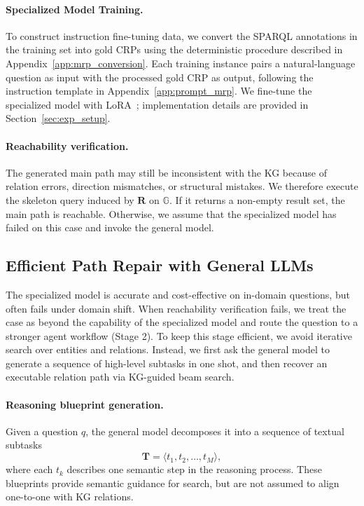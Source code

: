 \documentclass[11pt]{article}
\begin{document}
\paragraph{Specialized Model Training.}
To construct instruction fine-tuning data, we convert the SPARQL annotations in the training set into gold CRPs using the deterministic procedure described in Appendix~\ref{app:mrp_conversion}. Each training instance pairs a natural-language question as input with the processed gold CRP as output, following the instruction template in Appendix~\ref{app:prompt_mrp}. We fine-tune the specialized model with LoRA~\citep{hu2022lora}; implementation details are provided in Section~\ref{sec:exp_setup}.

\paragraph{Reachability verification.}
The generated main path may still be inconsistent with the KG because of relation errors, direction mismatches, or structural mistakes. We therefore execute the skeleton query induced by $\mathbf{R}$ on $\mathbb{G}$. If it returns a non-empty result set, the main path is reachable. Otherwise, we assume that the specialized model has failed on this case and invoke the general model.


\subsection{Efficient Path Repair with General LLMs}
\label{sec:kg_correction}

The specialized model is accurate and cost-effective on in-domain questions, but often fails under domain shift. When reachability verification fails, we treat the case as beyond the capability of the specialized model and route the question to a stronger agent workflow (Stage 2). To keep this stage efficient, we avoid iterative search over entities and relations. Instead, we first ask the general model to generate a sequence of high-level subtasks in one shot, and then recover an executable relation path via KG-guided beam search.

\paragraph{Reasoning blueprint generation.}
Given a question $q$, the general model decomposes it into a sequence of textual subtasks
\begin{equation}
\mathbf{T}=\langle t_1,t_2,\ldots,t_M\rangle,
\end{equation}
where each $t_k$ describes one semantic step in the reasoning process. These blueprints provide semantic guidance for search, but are not assumed to align one-to-one with KG relations.
\end{document}
